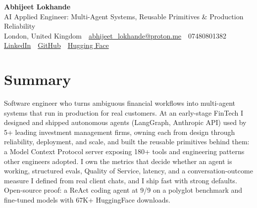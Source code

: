 \documentclass[10pt,a4paper]{article}
\newcommand{\sep}{\,\textcolor{accent!60}{\textbar}\,}
\begin{document}
\begin{center}
  {\fontsize{24}{26}\selectfont\bfseries Abhijeet Lokhande}\\[3pt]
  {\color{accent}\large AI Applied Engineer: Multi-Agent Systems, Reusable Primitives \& Production Reliability}\\[5pt]
  {\small
    London, United Kingdom \sep
    \href{mailto:abhijeet_lokhande@proton.me}{abhijeet\_lokhande@proton.me} \sep
    07480801382 \\[2pt]
    \href{https://www.linkedin.com/in/ablds/}{LinkedIn} \sep
    \href{https://github.com/abhijeetscode}{GitHub} \sep
    \href{https://huggingface.co/ab-ai}{Hugging Face}
  }
\end{center}
\vspace{2pt}

\section{Summary}
Software engineer who turns ambiguous financial workflows into multi-agent systems that run in production for real customers. At an early-stage FinTech I designed and shipped autonomous agents (LangGraph, Anthropic API) used by 5+ leading investment management firms, owning each from design through reliability, deployment, and scale, and built the reusable primitives behind them: a Model Context Protocol server exposing 180+ tools and engineering patterns other engineers adopted. I own the metrics that decide whether an agent is working, structured evals, Quality of Service, latency, and a conversation-outcome measure I defined from real client chats, and I ship fast with strong defaults. Open-source proof: a ReAct coding agent at 9/9 on a polyglot benchmark and fine-tuned models with 67K+ HuggingFace downloads.

\end{document}
